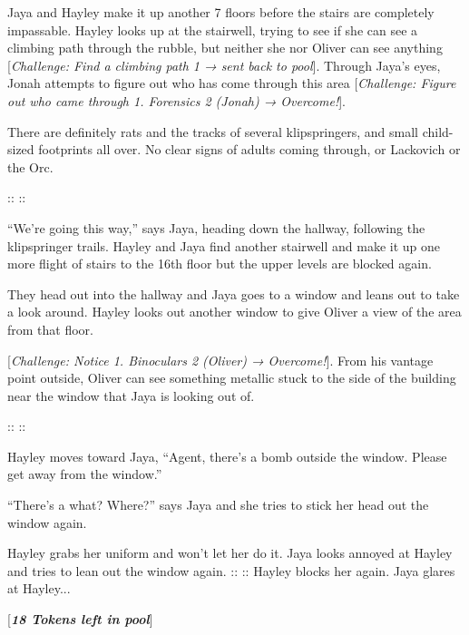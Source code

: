 Jaya and Hayley make it up another 7 floors before the stairs are completely impassable. Hayley looks up at the stairwell, trying to see if she can see a climbing path through the rubble, but neither she nor Oliver can see anything {[}\textit{Challenge: Find a climbing path 1 → sent back to pool}{]}.  Through Jaya's eyes, Jonah attempts to figure out who has come through this area {[}\textit{Challenge: Figure out who came through 1.  Forensics 2 (Jonah) → Overcome!}{]}.  



There are definitely rats and the tracks of several klipspringers, and small child-sized footprints all over.  No clear signs of adults coming through, or Lackovich or the Orc.

::  ::

``We're going this way,'' says Jaya, heading down the hallway, following the klipspringer trails.  Hayley and Jaya find another stairwell and make it up one more flight of stairs to the 16th floor but the upper levels are blocked again.



They head out into the hallway and Jaya goes to a window and leans out to take a look around.  Hayley looks out another window to give Oliver a view of the area from that floor.

{[}\textit{Challenge: Notice 1.  Binoculars 2 (Oliver) → Overcome!}{]}. From his vantage point outside, Oliver can see something metallic stuck to the side of the building near the window that Jaya is looking out of.

::  ::

Hayley moves toward Jaya, ``Agent, there's a bomb outside the window.  Please get away from the window.''

``There's a what?  Where?'' says Jaya and she tries to stick her head out the window again.

Hayley grabs her uniform and won't let her do it.  Jaya looks annoyed at Hayley and tries to lean out the window again.  ::  ::  Hayley blocks her again.  Jaya glares at Hayley...



{[}\textit{\textbf{18 Tokens left in pool}}{]}



